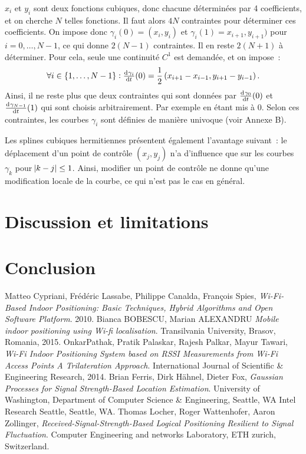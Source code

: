 \documentclass[10pt,journal,compsoc]{IEEEtran}
\begin{document}
	  $x_i$ et $y_i$ sont deux fonctions cubiques, donc chacune déterminées par 4 coefficients, et on cherche $N$ telles fonctions. Il faut alors $4N$ contraintes
	  pour déterminer ces coefficients. On impose donc $\gamma_i(0) = (x_i, y_i)$ et $\gamma_i(1) = x_{i+1}, y_{i+1})$ %
	  pour $i = 0, \ldots, {N-1}$, ce qui donne $2(N-1)$
	  contraintes. Il en reste $2(N+1)$ à déterminer. Pour cela, seule une continuité $C^1$ est demandée, et on impose~:
	  \begin{equation}
	  	\forall i \in \{1, \ldots, N-1\} : \od {\gamma_i}t(0) = \frac 12\left(x_{i+1}-x_{i-1}, y_{i+1}-y_{i-1}\right).
	  \end{equation}
	  Ainsi, il ne reste plus que deux contraintes qui sont données par $\od {\gamma_0}t(0)$ et $\od {\gamma_{N-1}}t(1)$ qui sont choisis arbitrairement. Par exemple
	  en étant mis à 0. Selon ces contraintes, les courbes $\gamma_i$ sont définies de manière univoque (voir Annexe B).

	  Les splines cubiques hermitiennes présentent également l'avantage suivant~: le déplacement d'un point de contrôle $(x_j, y_j)$ n'a d'influence que sur les courbes
	  $\gamma_k$ pour $\abs {k-j} \leq 1$. Ainsi, modifier un point de contrôle ne donne qu'une modification locale de la courbe, ce qui n'est pas le cas en général.
\section{Discussion et limitations}
\section{Conclusion}

\begin{thebibliography}{9}
    Matteo Cypriani, Frédéric Lassabe, Philippe Canalda, François Spies,
    \emph{Wi-Fi-Based Indoor Positioning: Basic Techniques, Hybrid Algorithms and Open Software Platform}.
    2010.
    Bianca BOBESCU, Marian ALEXANDRU
    \emph{Mobile indoor positioning using Wi-fi localisation}.
    Transilvania University, Brasov, Romania,
    2015.
    OnkarPathak, Pratik Palaskar, Rajesh Palkar, Mayur Tawari,
    \emph{Wi-Fi Indoor Positioning System based on RSSI Measurements from Wi-Fi Access Points A Trilateration Approach}.
    International Journal of Scientific \& Engineering Research,
    2014.
    Brian Ferris, Dirk Hähnel, Dieter Fox,
    \emph{Gaussian Processes for Signal Strength-Based Location Estimation}.
    University of Washington, Department of Computer Science \& Engineering, Seattle, WA Intel Research Seattle, Seattle, WA.
    Thomas Locher, Roger Wattenhofer, Aaron Zollinger,
    \emph{Received-Signal-Strength-Based Logical Positioning Resilient to Signal Fluctuation}.
    Computer Engineering and networks Laboratory, ETH zurich, Switzerland.
\end{thebibliography}
\end{document}
